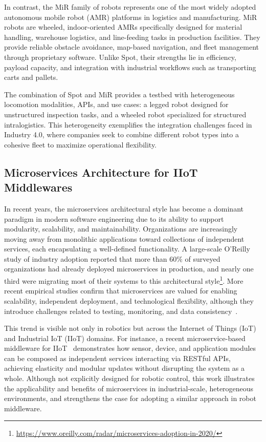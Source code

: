 \documentclass[conference]{IEEEtran}
\begin{document}
In contrast, the MiR family of robots represents one of the most widely adopted 
 autonomous mobile robot (AMR) platforms in logistics and manufacturing.
%
MiR robots are wheeled, indoor-oriented AMRs specifically designed for material handling, warehouse logistics, 
 and line-feeding tasks in production facilities. 
% 
They provide reliable obstacle avoidance, map-based navigation, 
 and fleet management through proprietary software. 
% 
Unlike Spot, their strengths lie in efficiency, payload capacity, and integration 
 with industrial workflows such as transporting carts and pallets.

The combination of Spot and MiR provides a testbed with heterogeneous 
 locomotion modalities, APIs, and use cases: 
  a legged robot designed for unstructured inspection tasks, 
  and a wheeled robot specialized for structured intralogistics. 
%
This heterogeneity exemplifies the integration challenges faced in Industry 4.0, 
 where companies seek to combine different robot types into a cohesive fleet 
 to maximize operational flexibility.

\subsection{Microservices Architecture for IIoT Middlewares}
In recent years, 
 the microservices architectural style has become a dominant paradigm in modern software engineering 
  due to its ability to support modularity, scalability, and maintainability. 
%  
Organizations are increasingly moving away from monolithic applications toward collections of independent services, 
 each encapsulating a well-defined functionality.
 A large-scale O'Reilly study of industry adoption reported that more than $60\%$ 
  of surveyed organizations had already deployed microservices in production, 
  and nearly one third were migrating most of their systems to this architectural 
  style\footnote{\url{https://www.oreilly.com/radar/microservices-adoption-in-2020/}}. 
%  
More recent empirical studies confirm that microservices are valued for enabling scalability, 
 independent deployment, and technological flexibility, although they introduce challenges related to 
 testing, monitoring, and data consistency~\cite{nogueira2024icsm}.

This trend is visible not only in robotics 
 but across the Internet of Things (IoT) and Industrial IoT (IIoT) domains. 
% 
For instance, a recent microservice-based middleware for IIoT~\cite{venanzi2021globecom} demonstrates how 
 sensor, device, and application modules can be composed as independent services interacting via RESTful APIs, 
  achieving elasticity and modular updates without disrupting the system as a whole. 
%  
Although not explicitly designed for robotic control, 
 this work illustrates the applicability and benefits of microservices in 
  industrial-scale, heterogeneous environments, and strengthens the case 
  for adopting a similar approach in robot middleware.
\end{document}
